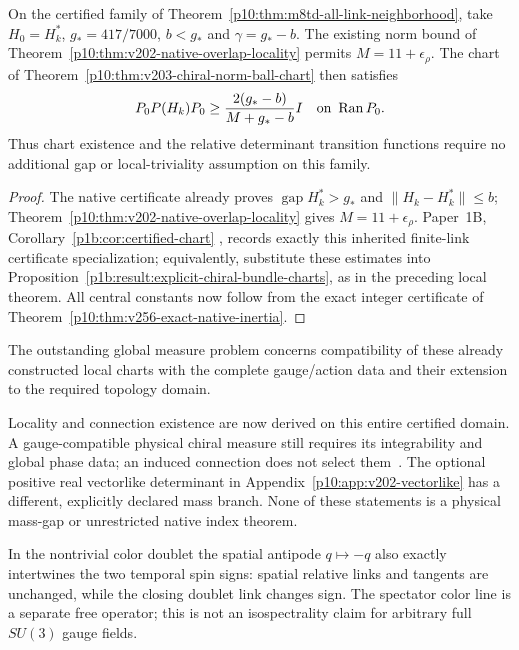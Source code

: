 \documentclass[12pt,a4paper]{article}
\begin{document}
\begin{corollary}
\label{p10:cor:v204-native-chart-discharge}
On the certified family of
Theorem~\ref{p10:thm:m8td-all-link-neighborhood}, take
$H_0=H_k^*$, $g_*=417/7000$, $b<g_*$ and $\gamma=g_*-b$.
The existing norm bound of
Theorem~\ref{p10:thm:v202-native-overlap-locality} permits
$M=11+\epsilon_\rho$. The chart of
Theorem~\ref{p10:thm:v203-chiral-norm-ball-chart} then satisfies
\[
 P_0P(H_k)P_0\ge\frac{2(g_*-b)}{M+g_*-b}I
 \quad\hbox{on }\operatorname{Ran}P_0.
\]
Thus chart existence and the relative determinant transition functions
require no additional gap or local-triviality assumption on this family.
\end{corollary}
\begin{proof}
The native certificate already proves
$\operatorname{gap}H_k^*>g_*$ and $\|H_k-H_k^*\|\le b$;
Theorem~\ref{p10:thm:v202-native-overlap-locality} gives
$M=11+\epsilon_\rho$.  Paper~1B,
Corollary~\ref{p1b:cor:certified-chart}
\cite{Kugelmann2026Paper1B}, records exactly this inherited finite-link
certificate specialization; equivalently, substitute these estimates into
Proposition~\ref{p1b:result:explicit-chiral-bundle-charts}, as in the
preceding local theorem.
All central constants now follow from the exact integer certificate of
Theorem~\ref{p10:thm:v256-exact-native-inertia}.
\end{proof}
The outstanding global measure problem concerns compatibility of these
already constructed local charts with the complete gauge/action data and
their extension to the required topology domain.

Locality and connection existence are now derived on this entire certified
domain. A gauge-compatible physical chiral measure still requires its
integrability and global phase data; an induced connection does not select
them~\cite{Luscher2001ChiralRevisited}. The optional positive real
vectorlike determinant in Appendix~\ref{p10:app:v202-vectorlike} has a
different, explicitly declared mass branch. None of these statements is a
physical mass-gap or unrestricted native index theorem.



In the nontrivial color doublet the spatial antipode \(q\mapsto-q\)
also exactly intertwines the two temporal spin signs: spatial relative
links and tangents are unchanged, while the closing doublet link changes
sign.  The spectator color line is a separate free operator; this is not an
isospectrality claim for arbitrary full \(SU(3)\) gauge fields.
\end{document}
